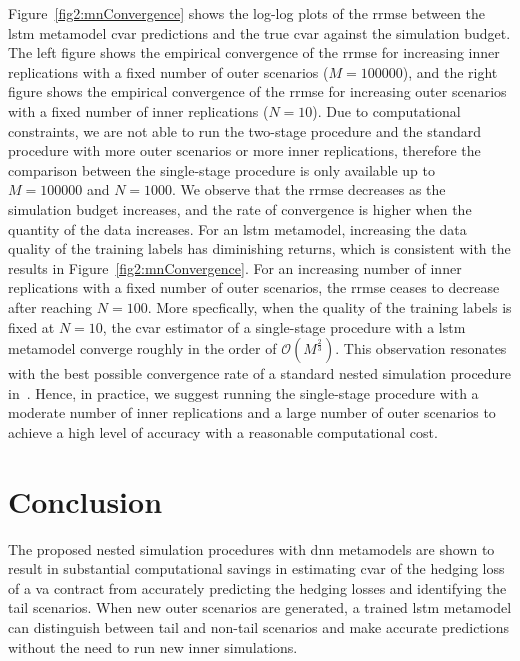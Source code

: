 Figure~\ref{fig2:mnConvergence} shows the log-log plots of the \gls{rrmse} between the \gls{lstm} metamodel \gls{cvar} predictions and the true \gls{cvar} against the simulation budget.
The left figure shows the empirical convergence of the \gls{rrmse} for increasing inner replications with a fixed number of outer scenarios ($M=\num{100000}$), and the right figure shows the empirical convergence of the \gls{rrmse} for increasing outer scenarios with a fixed number of inner replications ($N=\num{10}$).
Due to computational constraints, we are not able to run the two-stage procedure and the standard procedure with more outer scenarios or more inner replications, therefore the comparison between the single-stage procedure is only available up to $M = \num{100000}$ and $N = \num{1000}$.
We observe that the \gls{rrmse} decreases as the simulation budget increases, and the rate of convergence is higher when the quantity of the data increases.
For an \gls{lstm} metamodel, increasing the data quality of the training labels has diminishing returns, which is consistent with the results in Figure~\ref{fig2:mnConvergence}.
For an increasing number of inner replications with a fixed number of outer scenarios, the \gls{rrmse} ceases to decrease after reaching $N = \num{100}$. 
More specfically, when the quality of the training labels is fixed at $N = \num{10}$, the \gls{cvar} estimator of a single-stage procedure with a \gls{lstm} metamodel converge roughly in the order of $\mathcal{O}(M^{\frac{2}{3}})$.
This observation resonates with the best possible convergence rate of a standard nested simulation procedure in~\cite{gordy2010nested}.
Hence, in practice, we suggest running the single-stage procedure with a moderate number of inner replications and a large number of outer scenarios to achieve a high level of accuracy with a reasonable computational cost.


\section{Conclusion} \label{sec2:conclusion}
The proposed nested simulation procedures with \gls{dnn} metamodels are shown to result in substantial computational savings in estimating \gls{cvar} of the hedging loss of a \gls{va} contract from accurately predicting the hedging losses and identifying the tail scenarios.
When new outer scenarios are generated, a trained \gls{lstm} metamodel can distinguish between tail and non-tail scenarios and make accurate predictions without the need to run new inner simulations.

